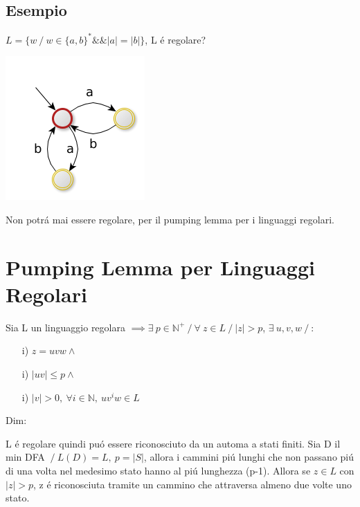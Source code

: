 \subsection{Esempio}
$L=\{ w \ / \ w \in \{ a, b \} ^* \&\& |a|=|b|\}$, L \'e regolare?
\begin{center}
	\includegraphics[scale=0.5]{Chapters/Img/c02_13.png}\\
\end{center} 
Non potr\'a mai essere regolare, per il pumping lemma per i linguaggi regolari.

\section{Pumping Lemma per Linguaggi Regolari}

Sia L un linguaggio regolara
$\implies \exists\ p \in \mathbb{N}^+ \ / \ \forall\ z \in L \ / \ |z| > p$,
$\exists\ u,v,w \ / \ $:
\begin{itemize}
    \item[i)] $z = uvw \land$\\
    \item[i)] $|uv| \leq p \land$\\
    \item[i)] $|v| > 0,\ \forall i \in \mathbb{N},\ u v^i w \in L$\\
\end{itemize}

Dim:

L \'e regolare quindi pu\'o essere riconosciuto da un automa a stati finiti.
Sia D il min DFA $\ / \ L(D) = L,\ p = |S|$, allora i cammini pi\'u lunghi che non passano pi\'u di una volta nel medesimo 
stato hanno al pi\'u lunghezza (p-1).
Allora se $z \in L$ con $|z|>p$, z \'e riconosciuta tramite un cammino che attraversa almeno due volte uno stato. 

